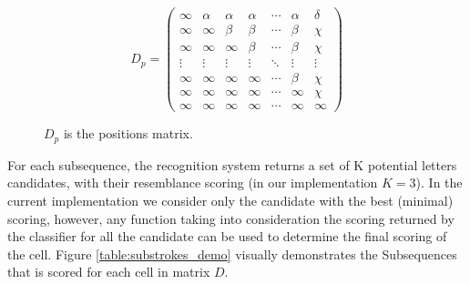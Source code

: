 \documentclass[journal,compsoc]{IEEEtran}
\begin{document}
\begin{figure}
\begin{equation}
D_{p}=
\left( 
\begin{array}{ccccccc}
\infty 	& \alpha & \alpha & \alpha  & \cdots & \alpha & \delta \\
\infty  & \infty  & \beta   & \beta   & \cdots  & \beta  & \chi    \\
\infty  & \infty  & \infty   & \beta   & \cdots  & \beta  & \chi    \\
\vdots & \vdots & \vdots  & \vdots & \ddots  & \vdots & \vdots \\
\infty  & \infty  & \infty   & \infty   & \cdots  & \beta  & \chi    \\
\infty  & \infty  & \infty   & \infty   & \cdots  & \infty  & \chi    \\
\infty  & \infty  & \infty   & \infty   & \cdots  & \infty  & \infty \end{array} \right)
\label{dp_matrix}
\end{equation}
\label{table:positions_matrix}
\caption{$D_{p}$ is the positions matrix.}
\end{figure}

For each subsequence, the recognition system returns a set of K potential letters candidates, with their resemblance scoring (in our implementation $K=3$). In the current implementation we consider only the candidate with the best (minimal) scoring, however, any function taking into consideration the scoring returned by the classifier for all the candidate can be used to determine the final scoring of the cell.
Figure \ref{table:substrokes_demo} visually demonstrates the Subsequences that is scored for each cell in matrix $D$.
\end{document}
